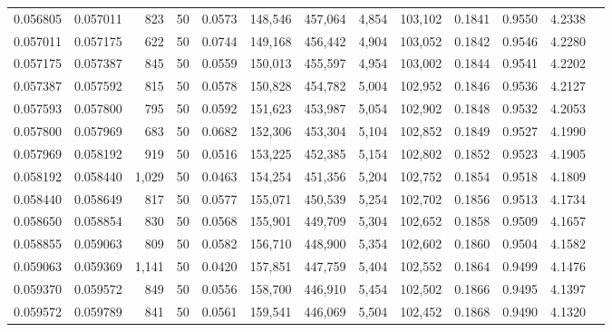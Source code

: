 \begin{tabular}{rrrrrrrrrrrrr}
0.056805 & 0.057011 &   823 &  50 &                                     0.0573 & 148,546 & 457,064 &   4,854 & 103,102 & 0.1841 & 0.9550 & 4.2338 \\
0.057011 & 0.057175 &   622 &  50 &                                     0.0744 & 149,168 & 456,442 &   4,904 & 103,052 & 0.1842 & 0.9546 & 4.2280 \\
0.057175 & 0.057387 &   845 &  50 &                                     0.0559 & 150,013 & 455,597 &   4,954 & 103,002 & 0.1844 & 0.9541 & 4.2202 \\
0.057387 & 0.057592 &   815 &  50 &                                     0.0578 & 150,828 & 454,782 &   5,004 & 102,952 & 0.1846 & 0.9536 & 4.2127 \\
0.057593 & 0.057800 &   795 &  50 &                                     0.0592 & 151,623 & 453,987 &   5,054 & 102,902 & 0.1848 & 0.9532 & 4.2053 \\
0.057800 & 0.057969 &   683 &  50 &                                     0.0682 & 152,306 & 453,304 &   5,104 & 102,852 & 0.1849 & 0.9527 & 4.1990 \\
0.057969 & 0.058192 &   919 &  50 &                                     0.0516 & 153,225 & 452,385 &   5,154 & 102,802 & 0.1852 & 0.9523 & 4.1905 \\
0.058192 & 0.058440 & 1,029 &  50 &                                     0.0463 & 154,254 & 451,356 &   5,204 & 102,752 & 0.1854 & 0.9518 & 4.1809 \\
0.058440 & 0.058649 &   817 &  50 &                                     0.0577 & 155,071 & 450,539 &   5,254 & 102,702 & 0.1856 & 0.9513 & 4.1734 \\
0.058650 & 0.058854 &   830 &  50 &                                     0.0568 & 155,901 & 449,709 &   5,304 & 102,652 & 0.1858 & 0.9509 & 4.1657 \\
0.058855 & 0.059063 &   809 &  50 &                                     0.0582 & 156,710 & 448,900 &   5,354 & 102,602 & 0.1860 & 0.9504 & 4.1582 \\
0.059063 & 0.059369 & 1,141 &  50 &                                     0.0420 & 157,851 & 447,759 &   5,404 & 102,552 & 0.1864 & 0.9499 & 4.1476 \\
0.059370 & 0.059572 &   849 &  50 &                                     0.0556 & 158,700 & 446,910 &   5,454 & 102,502 & 0.1866 & 0.9495 & 4.1397 \\
0.059572 & 0.059789 &   841 &  50 &                                     0.0561 & 159,541 & 446,069 &   5,504 & 102,452 & 0.1868 & 0.9490 & 4.1320 \\

\end{tabular}
